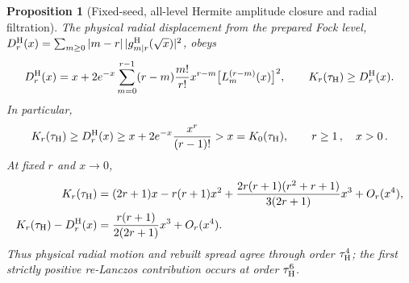 \documentclass[a4paper,11pt]{article}
\def\ee{e}%
\newtheorem{proposition}{Proposition}[section]
\theoremstyle{definition}
\theoremstyle{remark}
\newcommand{\ee}{\mathrm e}
\begin{document}
\begin{proposition}[Fixed-seed, all-level Hermite amplitude closure and radial filtration]
The physical radial displacement from the prepared Fock level,
$D_r^{\rm H}(x)=\sum_{m\ge0}|m-r|\,
|g_{m|r}^{\rm H}(\sqrt x)|^2$, obeys
\begin{equation}
   D_r^{\rm H}(x)=x+2\ee^{-x}\sum_{m=0}^{r-1}
      (r-m)\frac{m!}{r!}x^{r-m}
      \bigl[L_m^{(r-m)}(x)\bigr]^2,
   \qquad
   K_r(\tau_{\rm H})\ge D_r^{\rm H}(x).
   \label{eq:Hermite-radial-exact-app}
\end{equation}
In particular,
\begin{equation}
   K_r(\tau_{\rm H})\ge D_r^{\rm H}(x)
   \ge x+2\ee^{-x}\frac{x^r}{(r-1)!}
   >x=K_0(\tau_{\rm H}),
   \qquad r\ge1\,,\quad x>0\,.
   \label{eq:Hermite-all-r-vacuum-bound-app}
\end{equation}
At fixed $r$ and $x\to0$,
\begin{equation}
\begin{aligned}
   K_r(\tau_{\rm H})
   &=(2r+1)x-r(r+1)x^2
     +\frac{2r(r+1)(r^2+r+1)}{3(2r+1)}x^3+O_r(x^4),\\
   K_r(\tau_{\rm H})-D_r^{\rm H}(x)
   &=\frac{r(r+1)}{2(2r+1)}x^3+O_r(x^4).
   \label{eq:Hermite-all-r-short-time-app}
\end{aligned}
\end{equation}
Thus physical radial motion and rebuilt spread agree through order $\tau_{\rm H}^4$; the first
strictly positive re-Lanczos contribution occurs at order $\tau_{\rm H}^6$.
\end{proposition}
\end{document}
